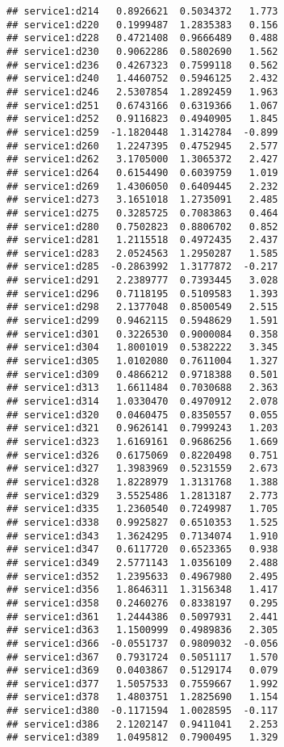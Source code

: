 \documentclass[
]{article}
\begin{document}
\begin{verbatim}
## service1:d214   0.8926621  0.5034372   1.773
## service1:d220   0.1999487  1.2835383   0.156
## service1:d228   0.4721408  0.9666489   0.488
## service1:d230   0.9062286  0.5802690   1.562
## service1:d236   0.4267323  0.7599118   0.562
## service1:d240   1.4460752  0.5946125   2.432
## service1:d246   2.5307854  1.2892459   1.963
## service1:d251   0.6743166  0.6319366   1.067
## service1:d252   0.9116823  0.4940905   1.845
## service1:d259  -1.1820448  1.3142784  -0.899
## service1:d260   1.2247395  0.4752945   2.577
## service1:d262   3.1705000  1.3065372   2.427
## service1:d264   0.6154490  0.6039759   1.019
## service1:d269   1.4306050  0.6409445   2.232
## service1:d273   3.1651018  1.2735091   2.485
## service1:d275   0.3285725  0.7083863   0.464
## service1:d280   0.7502823  0.8806702   0.852
## service1:d281   1.2115518  0.4972435   2.437
## service1:d283   2.0524563  1.2950287   1.585
## service1:d285  -0.2863992  1.3177872  -0.217
## service1:d291   2.2389777  0.7393445   3.028
## service1:d296   0.7118195  0.5109583   1.393
## service1:d298   2.1377048  0.8500549   2.515
## service1:d299   0.9462115  0.5948629   1.591
## service1:d301   0.3226530  0.9000084   0.358
## service1:d304   1.8001019  0.5382222   3.345
## service1:d305   1.0102080  0.7611004   1.327
## service1:d309   0.4866212  0.9718388   0.501
## service1:d313   1.6611484  0.7030688   2.363
## service1:d314   1.0330470  0.4970912   2.078
## service1:d320   0.0460475  0.8350557   0.055
## service1:d321   0.9626141  0.7999243   1.203
## service1:d323   1.6169161  0.9686256   1.669
## service1:d326   0.6175069  0.8220498   0.751
## service1:d327   1.3983969  0.5231559   2.673
## service1:d328   1.8228979  1.3131768   1.388
## service1:d329   3.5525486  1.2813187   2.773
## service1:d335   1.2360540  0.7249987   1.705
## service1:d338   0.9925827  0.6510353   1.525
## service1:d343   1.3624295  0.7134074   1.910
## service1:d347   0.6117720  0.6523365   0.938
## service1:d349   2.5771143  1.0356109   2.488
## service1:d352   1.2395633  0.4967980   2.495
## service1:d356   1.8646311  1.3156348   1.417
## service1:d358   0.2460276  0.8338197   0.295
## service1:d361   1.2444386  0.5097931   2.441
## service1:d363   1.1500999  0.4989836   2.305
## service1:d366  -0.0551737  0.9809032  -0.056
## service1:d367   0.7931724  0.5051117   1.570
## service1:d369   0.0403867  0.5129174   0.079
## service1:d377   1.5057533  0.7559667   1.992
## service1:d378   1.4803751  1.2825690   1.154
## service1:d380  -0.1171594  1.0028595  -0.117
## service1:d386   2.1202147  0.9411041   2.253
## service1:d389   1.0495812  0.7900495   1.329

\end{verbatim}
\end{document}
